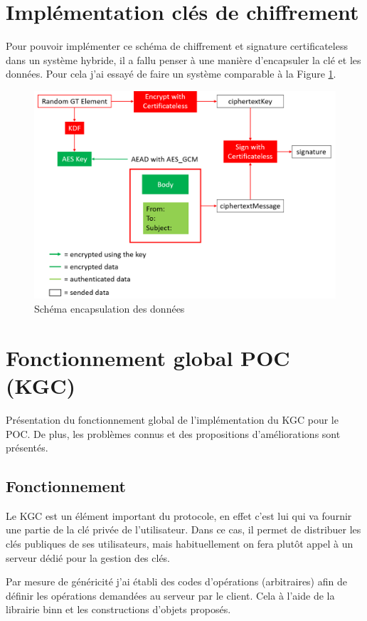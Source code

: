 \section{Implémentation clés  de chiffrement}
Pour pouvoir implémenter ce schéma de chiffrement et signature certificateless dans un système hybride, il a fallu penser à une manière d'encapsuler la clé et les données. Pour cela j'ai essayé de faire un système comparable à la Figure \ref{fig:encapsulate}.

\begin{figure}[h!]
	\centering
	\includegraphics[width=\textwidth]{images/schemCles.png}
	\caption{Schéma encapsulation des données}
	\label{fig:encapsulate}
\end{figure}

\section{Fonctionnement global POC (KGC)}
Présentation du fonctionnement global de l'implémentation du KGC pour le POC. De plus, les problèmes connus et des propositions d'améliorations sont présentés.
\subsection{Fonctionnement}
Le KGC est un élément important du protocole, en effet c'est lui qui va fournir une partie de la clé privée de l'utilisateur. Dans ce cas, il permet de distribuer les clés publiques de ses utilisateurs, mais habituellement on fera plutôt appel à un serveur dédié pour la gestion des clés.

Par mesure de généricité j'ai établi des codes d'opérations (arbitraires) afin de définir les opérations demandées au serveur par le client. Cela à l'aide de la librairie binn et les constructions d'objets proposés.

